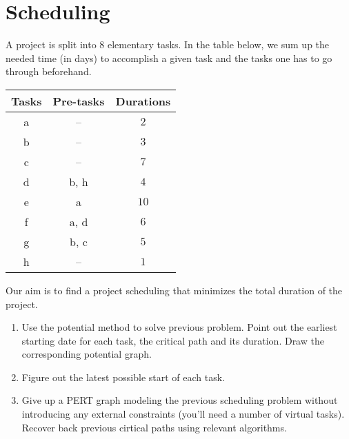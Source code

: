 \documentclass[11pt,a4paper]{article}
\begin{document}
\section{Scheduling}

\begin{question}[subtitle={Project Scheduling}]
  A project is split into $8$ elementary tasks. In the table below, we
  sum up the needed time (in days) to accomplish a given task and the
  tasks one has to go through beforehand.
    \begin{center}
    \renewcommand{\arraystretch}{1.5}
    \begin{tabular}{|c|c|c|}
      \hline
      Tasks & Pre-tasks & Durations  \\
      \hline
      a & -- &  $2$ \\
      \hline
      b & --  & $3$ \\
      \hline
      c & --  & $7$ \\
      \hline
      d & b, h  & $4$ \\
      e & a  & $10$ \\
      \hline
      f & a, d  & $6$ \\
      \hline
      g & b, c  & $5$ \\
      \hline
      h & --  & $1$ \\
      \hline
    \end{tabular}
  \end{center}
  Our aim is to find a project scheduling that minimizes the total
  duration of the project.
  \begin{enumerate}
  \item Use the potential method to solve previous problem. Point out
    the earliest starting date for each task, the critical path and
    its duration. Draw the corresponding potential graph.
  \item Figure out the latest possible start of each task. 
  \item Give up a PERT graph modeling the previous scheduling problem
    without introducing any external constraints (you'll need a number
    of virtual tasks). Recover back previous cirtical paths using
    relevant algorithms.
  \end{enumerate}
  
\end{question}
\end{document}
